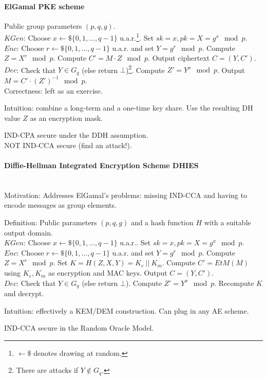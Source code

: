 \paragraph{ElGamal PKE scheme}
Public group parameters $(p, q, g)$.
\\
$KGen$:
Choose $x \leftarrow \$ \{ 0, 1, \dots, q-1 \}$ u.a.r.\footnote{$\leftarrow\$$ denotes drawing at random.}.
Set $sk = x, pk = X = g^x \mod p$.
\\
$Enc$:
Choose $r \leftarrow \$ \{ 0, 1, \dots, q-1 \}$ u.a.r. and set $Y = g^r \mod p$.
Compute $Z = X^r \mod p$.
Compute $C' = M \cdot Z \mod p$.
Output ciphertext $C = (Y, C')$.
\\
$Dec$:
Check that $Y \in G_q$ (else return $\bot$)\footnote{There are attacks if $Y \not \in G_q$.}.
Compute $Z' = Y^x \mod p$.
Output $M = C' \cdot (Z')^{-1} \mod p$.
\\
Correctness: left as an exercise.

Intuition: combine a long-term and a one-time key share.
Use the resulting DH value $Z$ as an encryption mask.

IND-CPA secure under the DDH assumption. \\
NOT IND-CCA secure (find an attack!).


\paragraph{Diffie-Hellman Integrated Encryption Scheme DHIES} \mbox{} \\
Motivation:
Addresses ElGamal's problems: missing IND-CCA and having to encode messages as group elements.

Definition:
Public parameters $(p,q,g)$ and a hash function $H$ with a suitable output domain.
\\
$KGen$:
Choose $x \leftarrow \$ \{ 0, 1, \dots, q-1 \}$ u.a.r..
Set $sk = x, pk = X = g^x \mod p$.
\\
$Enc$:
Choose $r \leftarrow \$ \{ 0, 1, \dots, q-1 \}$ u.a.r. and set $Y = g^r \mod p$.
Compute $Z = X^r \mod p$.
Set $K = H(Z, X, Y) = K_e\ ||\ K_m$.
Compute $C' = EtM(M)$ using $K_e, K_m$ as encryption and MAC keys.
Output $C=(Y, C')$.
\\
$Dec$:
Check that $Y \in G_q$ (else return $\bot$).
Compute $Z' = Y^x \mod p$.
Recompute $K$ and decrypt.

Intuition: effectively a KEM/DEM construction. Can plug in any AE scheme.

IND-CCA secure in the Random Oracle Model.

